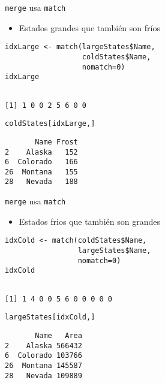\documentclass[aspectratio=169, usenames,svgnames,dvipsnames]{beamer}
\begin{document}
\begin{frame}[label={sec:org0daf063},fragile]{\texttt{merge} usa \texttt{match}}
 \begin{itemize}
\item Estados grandes que también son fríos
\end{itemize}
\lstset{language=r,label= ,caption= ,captionpos=b,numbers=none}
\begin{lstlisting}
idxLarge <- match(largeStates$Name,
                  coldStates$Name,
                  nomatch=0)
idxLarge
\end{lstlisting}

\begin{verbatim}

[1] 1 0 0 2 5 6 0 0
\end{verbatim}


\lstset{language=r,label= ,caption= ,captionpos=b,numbers=none}
\begin{lstlisting}
coldStates[idxLarge,]
\end{lstlisting}

\begin{verbatim}
       Name Frost
2    Alaska   152
6  Colorado   166
26  Montana   155
28   Nevada   188
\end{verbatim}
\end{frame}

\begin{frame}[label={sec:org4713eaa},fragile]{\texttt{merge} usa \texttt{match}}
 \begin{itemize}
\item Estados frios que también son grandes
\end{itemize}
\lstset{language=r,label= ,caption= ,captionpos=b,numbers=none}
\begin{lstlisting}
idxCold <- match(coldStates$Name,
                 largeStates$Name,
                 nomatch=0)
idxCold
\end{lstlisting}

\begin{verbatim}

[1] 1 4 0 0 5 6 0 0 0 0 0
\end{verbatim}


\lstset{language=r,label= ,caption= ,captionpos=b,numbers=none}
\begin{lstlisting}
largeStates[idxCold,]
\end{lstlisting}

\begin{verbatim}
       Name   Area
2    Alaska 566432
6  Colorado 103766
26  Montana 145587
28   Nevada 109889
\end{verbatim}
\end{frame}
\end{document}
